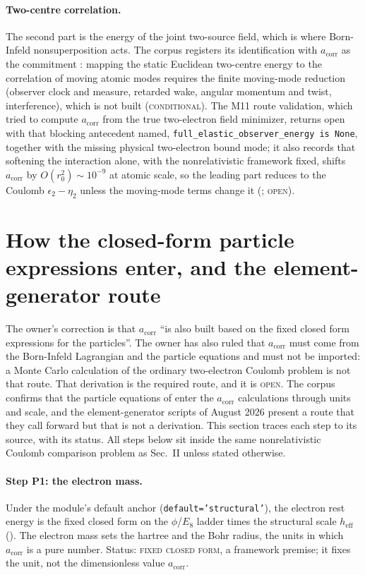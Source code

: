 \documentclass[aps,prd,onecolumn,amsmath,amssymb,longbibliography,floatfix,nofootinbib]{revtex4-2}
\newcommand{\acorr}{a_{\mathrm{corr}}}
\newcommand{\st}[1]{\textsc{#1}}
\begin{document}
\paragraph{Two-centre correlation.} The second part is the energy of the joint two-source field, which is where Born-Infeld nonsuperposition acts. The corpus registers its identification with $\acorr$ as the commitment : mapping the static Euclidean two-centre energy to the correlation of moving atomic modes requires the finite moving-mode reduction (observer clock and measure, retarded wake, angular momentum and twist, interference), which is not built (\st{conditional}). The M11 route validation, which tried to compute $\acorr$ from the true two-electron field minimizer, returns open with that blocking antecedent named, \texttt{full\_elastic\_observer\_energy is None}, together with the missing physical two-electron bound mode; it also records that softening the interaction alone, with the nonrelativistic framework fixed, shifts $\acorr$ by $O(r_0^2)\sim10^{-9}$ at atomic scale, so the leading part reduces to the Coulomb $\epsilon_2-\eta_2$ unless the moving-mode terms change it (; \st{open}).

\section{How the closed-form particle expressions enter, and the element-generator route}
\label{sec:particles}
The owner's correction is that $\acorr$ ``is also built based on the fixed closed form expressions for the particles''. The owner has also ruled that $\acorr$ must come from the Born-Infeld Lagrangian and the particle equations and must not be imported: a Monte Carlo calculation of the ordinary two-electron Coulomb problem is not that route. That derivation is the required route, and it is \st{open}. The corpus confirms that the particle equations of  enter the $\acorr$ calculations through units and scale, and the element-generator scripts of August 2026 present a route that they call forward but that is not a derivation. This section traces each step to its source, with its status. All steps below sit inside the same nonrelativistic Coulomb comparison problem as Sec.~II unless stated otherwise.

\paragraph{Step P1: the electron mass.} Under the module's default anchor (\texttt{default='structural'}), the electron rest energy is the fixed closed form on the $\phi$/$E_8$ ladder times the structural scale $h_{\mathrm{eff}}$ (). The electron mass sets the hartree and the Bohr radius, the units in which $\acorr$ is a pure number. Status: \st{fixed closed form}, a framework premise; it fixes the unit, not the dimensionless value $\acorr$.
\end{document}
